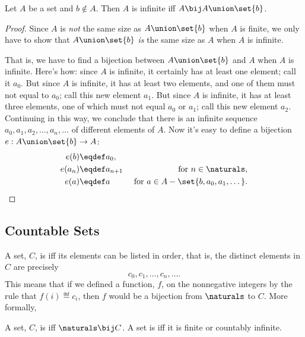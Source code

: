 \begin{lemma}\label{AUb}
  Let $A$ be a set and $b \notin A$.  Then $A$ is infinite iff $A \bij
  A \union \set{b}$.
\end{lemma}
\begin{proof}
  Since $A$ is \emph{not} the same size as $A \union \set{b}$ when $A$
  is finite, we only have to show that $A \union \set{b}$ \emph{is}
  the same size as $A$ when $A$ is infinite.

That is, we have to find a bijection between $A \union \set{b}$ and
$A$ when $A$ is infinite.  Here's how: since $A$ is infinite, it
certainly has at least one element; call it $a_0$.  But since $A$ is
infinite, it has at least two elements, and one of them must not equal
to $a_0$; call this new element $a_1$.  But since $A$ is infinite, it
has at least three elements, one of which must not equal $a_0$ or
$a_1$; call this new element $a_2$.  Continuing in this way, we
conclude that there is an infinite sequence
$a_0,a_1,a_2,\dots,a_n,\dots$ of different elements of $A$.  Now it's
easy to define a bijection $e: A \union \set{b} \to A$:
\begin{align*}
e(b) & \eqdef a_0,\\ e(a_n) & \eqdef a_{n+1} &\text{ for } n \in
\naturals,\\ e(a) & \eqdef a & \text{ for } a \in A -
\set{b,a_0,a_1,\dots}.
\end{align*}
\end{proof}

\subsection{Countable Sets}
A set, $C$, is  iff its elements can be listed in
order, that is, the distinct elements in $C$ are precisely
\[
c_0, c_1, \dots, c_n, \dots.
\]
This means that if we defined a function, $f$, on the nonnegative
integers by the rule that $f(i) \eqdef c_i$, then $f$ would be a
bijection from $\naturals$ to $C$.  More formally,

\begin{definition}
  A set, $C$, is  iff $\naturals \bij C$.  A
  set is  iff it is finite or countably infinite.
\end{definition}

